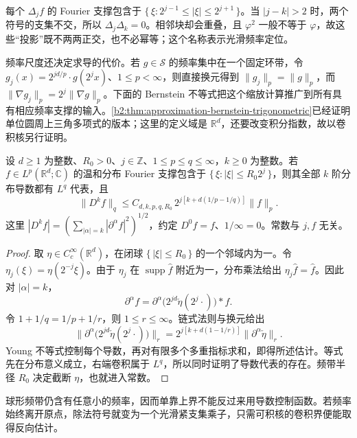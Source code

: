 每个 \(\Delta_jf\) 的 Fourier 支撑包含于 \(\{\,\xi:2^{j-1}\leq|\xi|\leq2^{j+1}\,\}\)。当 \(|j-k|>2\) 时，两个符号的支集不交，所以 \(\Delta_j\Delta_k=0\)。相邻块却会重叠，且 \(\varphi^2\) 一般不等于 \(\varphi\)，故这些“投影”既不两两正交，也不必幂等；这个名称表示光滑频率定位。

\ProseParagraphBreak

频率尺度还决定求导的代价。若 \(g\in\mathcal S\) 的频率集中在一个固定环带，令 \(g_j(x)=2^{jd/p}\cdot g(2^jx)\)、\(1\leq p<\infty\)，则直接换元得到 \(\|g_j\|_p=\|g\|_p\)，而 \(\|\nabla g_j\|_p=2^j\|\nabla g\|_p\)。下面的 Bernstein 不等式把这个缩放计算推广到所有具有相应频率支撑的输入。\cref{b2:thm:approximation-bernstein-trigonometric}已经证明单位圆周上三角多项式的版本；这里的定义域是 \(\mathbb R^d\)，还要改变积分指数，故以卷积核另行证明。

\begin{proposition}[Bernstein 估计]\label{b2:thm:19-bernstein}
设 \(d\geq1\) 为整数、\(R_0>0\)、\(j\in\mathbb Z\)、\(1\leq p\leq q\leq\infty\)，\(k\geq0\) 为整数。若 \(f\in L^p(\mathbb R^d;\mathbb C)\) 的温和分布 Fourier 支撑包含于 \(\{\,\xi:|\xi|\leq R_0 2^j\,\}\)，则其全部 \(k\) 阶分布导数都有 \(L^q\) 代表，且
\[
 \|D^kf\|_q
 \leq C_{d,k,p,q,R_0}\,2^{j[k+d(1/p-1/q)]}\|f\|_p.
\]
这里 \(|D^kf|=(\sum_{|\alpha|=k}|\partial^\alpha f|^2)^{1/2}\)，约定 \(D^0f=f\)、\(1/\infty=0\)。常数与 \(j,f\) 无关。
\end{proposition}
\begin{proof}
取 \(\eta\in C_c^\infty(\mathbb R^d)\)，在闭球 \(\{\,|\xi|\leq R_0\,\}\) 的一个邻域内为一。令 \(\eta_j(\xi)=\eta(2^{-j}\xi)\)。由于 \(\eta_j\) 在 \(\operatorname{supp}\widehat f\) 附近为一，分布乘法给出 \(\eta_j\widehat f=\widehat f\)。因此对 \(|\alpha|=k\)，
\[
 \partial^\alpha f
 =\partial^\alpha\bigl(2^{jd}\check\eta(2^j\cdot)\bigr)*f.
\]
令 \(1+1/q=1/p+1/r\)，则 \(1\leq r\leq\infty\)。链式法则与换元给出
\[
 \bigl\|\partial^\alpha
       \bigl(2^{jd}\check\eta(2^j\cdot)\bigr)\bigr\|_r
 =2^{j[k+d(1-1/r)]}\|\partial^\alpha\check\eta\|_r.
\]
Young 不等式控制每个导数，再对有限多个多重指标求和，即得所述估计。等式先在分布意义成立，右端卷积属于 \(L^q\)，所以同时证明了导数代表的存在。频带半径 \(R_0\) 决定截断 \(\eta\)，也就进入常数。
\end{proof}

球形频带仍含有任意小的频率，因而单靠上界不能反过来用导数控制函数。若频率始终离开原点，除法符号就变为一个光滑紧支集乘子，只需可积核的卷积界便能取得反向估计。

